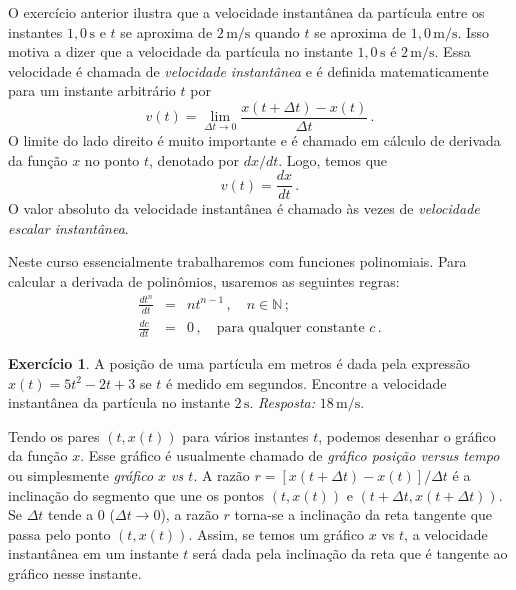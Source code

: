 \documentclass[12pt,a4paper]{article}
\newcommand{\N}{\mathbb{N}}
\theoremstyle{definition}
\newtheorem{ex}{Exercício}[section]
\begin{document}
O exercício anterior ilustra que a velocidade instantânea da partícula
entre os instantes $1{,}0\,\mathrm{s}$ e $t$ se aproxima de
$2\,\mathrm{m/s}$ quando $t$ se aproxima de
$1{,}0\,\mathrm{m/s}$. Isso motiva a dizer que a velocidade da
partícula no instante $1{,}0\,\mathrm{s}$ é $2\,\mathrm{m/s}$. Essa
velocidade é chamada de \emph{velocidade instantânea} e é definida
matematicamente para um instante arbitrário $t$ por
$$v(t)=\lim_{\Delta t\to 0}\frac{x(t+\Delta t)-x(t)}{\Delta t}\,.$$
O limite do lado direito é muito importante e é chamado em cálculo de
derivada da função $x$ no ponto $t$, denotado por $dx/dt$. Logo, temos
que
$$v(t)=\frac{dx}{dt}\,.$$
O valor absoluto da velocidade instantânea é chamado às vezes de
\emph{velocidade escalar instantânea}.

Neste curso essencialmente trabalharemos com funciones
polinomiais. Para calcular a derivada de polinômios, usaremos as
seguintes regras:
\begin{eqnarray*}
  \frac{dt^n}{dt}&=&nt^{n-1}\,,\quad n\in\N\,;\\
  \frac{dc}{dt}&=& 0\,,\quad\mbox{para qualquer constante }c\,.
\end{eqnarray*}

\begin{ex}
  A posição de uma partícula em metros é dada pela expressão
  $x(t)=5t^2-2t+3$ se $t$ é medido em segundos. Encontre a velocidade
  instantânea da partícula no instante
  $2\,\mathrm{s}$. \emph{Resposta:} $18\,\mathrm{m/s}$.
\end{ex}

Tendo os pares $(t,x(t))$ para vários instantes $t$, podemos desenhar
o gráfico da função $x$. Esse gráfico é usualmente chamado de
\emph{gráfico posição versus tempo} ou simplesmente \emph{gráfico $x$
  vs $t$}. A razão $r=[x(t+\Delta t)-x(t)]/\Delta t$ é a inclinação do
segmento que une os pontos $(t,x(t))$ e $(t+\Delta t,x(t+\Delta
t))$. Se $\Delta t$ tende a $0$ ($\Delta t\to 0$), a razão $r$
torna-se a inclinação da reta tangente que passa pelo ponto
$(t,x(t))$. Assim, se temos um gráfico $x$ vs $t$, a velocidade
instantânea em um instante $t$ será dada pela inclinação da reta que é
tangente ao gráfico nesse instante.
\end{document}
